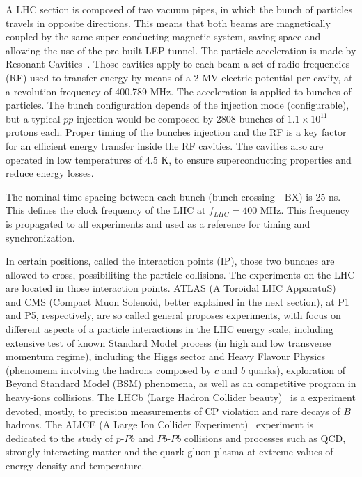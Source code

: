 A LHC section is composed of two vacuum pipes, in which the bunch of particles travels in opposite directions. This means that both beams are magnetically coupled by the same super-conducting magnetic system, saving space and allowing the use of the pre-built LEP tunnel. The particle acceleration is made by Resonant Cavities~\cite{Baird:1017689}. Those cavities apply to each beam a set of radio-frequencies (RF) used to transfer energy by means of a 2 MV electric potential per cavity, at a revolution frequency of 400.789 MHz. The acceleration is applied to bunches of particles. The bunch configuration depends of the injection mode (configurable), but a typical $pp$ injection would be composed by 2808 bunches of $1.1 \times 10^{11}$ protons each. Proper timing of the bunches injection and the RF is a key factor for an efficient energy transfer inside the RF cavities. The cavities also are operated in low temperatures of 4.5 K, to ensure superconducting properties and reduce energy losses.

The nominal time spacing between each bunch (bunch crossing - BX) is 25 ns. This defines the clock frequency of the LHC at $f_{LHC} = 400$ MHz. This frequency is propagated to all experiments and used as a reference for timing and synchronization. 

In certain positions, called the interaction points (IP), those two bunches are allowed to cross, possibiliting the particle collisions. The experiments on the LHC are located in those interaction points. ATLAS (A Toroidal LHC ApparatuS)~\cite{atlas_collaboration_2008} and CMS (Compact Muon Solenoid, better explained in the next section), at P1 and P5, respectively, are so called general proposes experiments, with focus on different aspects of a particle interactions in the LHC energy scale, including extensive test of known Standard Model process (in high and low transverse momentum regime), including the Higgs sector and Heavy Flavour Physics (phenomena involving the hadrons composed by $c$ and $b$ quarks), exploration of Beyond Standard Model (BSM) phenomena, as well as an competitive program in heavy-ions collisions. The LHCb (Large Hadron Collider beauty)~\cite{Alves:2008zz} is a experiment devoted, mostly, to precision measurements of CP violation and rare decays of $B$ hadrons. The ALICE (A Large Ion Collider Experiment)~\cite{Aamodt:2008zz} experiment is dedicated to the study of $p$-$Pb$ and $Pb$-$Pb$ collisions and processes such as QCD, strongly interacting matter and the quark-gluon plasma at extreme values of energy density and temperature.

